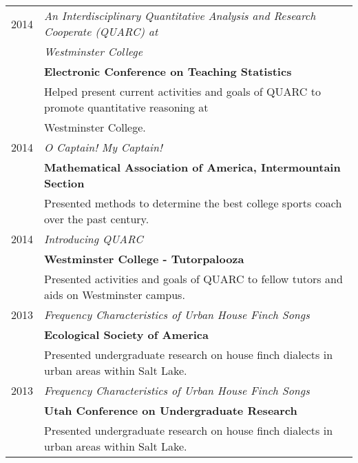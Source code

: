 \documentclass[a4paper,10pt]{article}
\begin{document}
\begin{tabular}{rl}
\textsc{2014}& \emph{An Interdisciplinary Quantitative Analysis and Research Cooperate (QUARC) at} \\
&\emph{Westminster College}
\\ & \textbf{Electronic Conference on Teaching Statistics}
\\ & \small{Helped present current activities and goals of QUARC to promote quantitative reasoning at}
\\ &\small{ Westminster College.} \\

\textsc{2014}& \emph{O Captain! My Captain!}
\\& \textbf{Mathematical Association of America, Intermountain Section}
\\& \small{Presented methods to determine the best college sports coach over
           the past century.}  \\

\textsc{2014} &\emph{Introducing QUARC}
\\& \textbf{Westminster College - Tutorpalooza}
\\& \small{Presented activities and goals of QUARC to fellow tutors and aids on
           Westminster campus.} \\

\textsc{2013}& \emph{Frequency Characteristics of Urban House Finch Songs}
\\& \textbf{Ecological Society of America}
\\& \small{Presented undergraduate research on house finch dialects in urban
           areas within Salt Lake.} \\

\textsc{2013}& \emph{Frequency Characteristics of Urban House Finch Songs}
\\& \textbf{Utah Conference on Undergraduate Research}
\\& \small{Presented undergraduate research on house finch dialects in urban
           areas within Salt Lake.}
\end{tabular}


\end{document}
